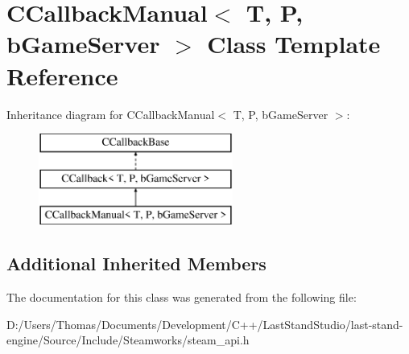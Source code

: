 \hypertarget{classCCallbackManual}{}\section{C\+Callback\+Manual$<$ T, P, b\+Game\+Server $>$ Class Template Reference}
\label{classCCallbackManual}
Inheritance diagram for C\+Callback\+Manual$<$ T, P, b\+Game\+Server $>$\+:\begin{figure}[H]
\begin{center}
\leavevmode
\includegraphics[height=3.000000cm]{classCCallbackManual}
\end{center}
\end{figure}
\subsection*{Additional Inherited Members}


The documentation for this class was generated from the following file\+:\begin{DoxyCompactItemize}
\item 
D\+:/\+Users/\+Thomas/\+Documents/\+Development/\+C++/\+Last\+Stand\+Studio/last-\/stand-\/engine/\+Source/\+Include/\+Steamworks/steam\+\_\+api.\+h\end{DoxyCompactItemize}
